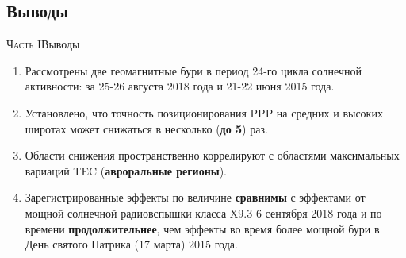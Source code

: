 \subsection{Выводы}
\begin{frame}{\textsc{Часть I}}{Выводы}
\begin{enumerate}
\justifying
\item Рассмотрены две геомагнитные бури в период 24-го цикла солнечной активности: за 25-26 августа 2018 года и 21-22 июня 2015 года.
\item Установлено, что точность позиционирования PPP на средних и высоких широтах может снижаться в несколько (\textbf{до 5}) раз.
\item Области снижения пространственно коррелируют с областями максимальных вариаций TEC (\textbf{авроральные регионы}). 
\item Зарегистрированные эффекты по величине \textbf{сравнимы} с эффектами от мощной солнечной радиовспышки класса X9.3 6 сентября 2018 года и по времени \textbf{продолжительнее}, чем эффекты во время более мощной бури в День святого Патрика (17 марта) 2015 года.
\end{enumerate}  
\end{frame}